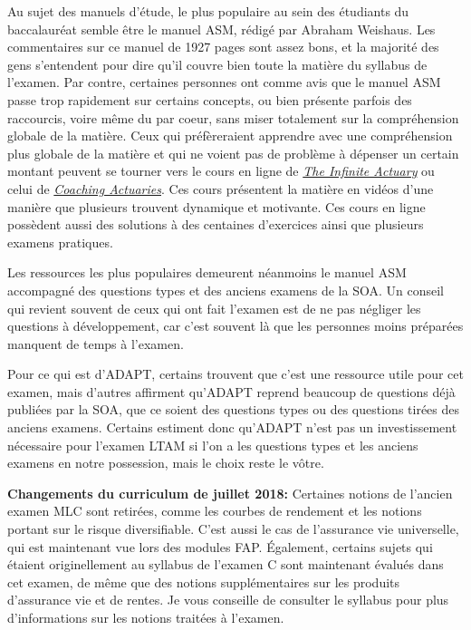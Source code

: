 Au sujet des manuels d'étude, le plus populaire au sein des étudiants du baccalauréat semble être le manuel ASM, rédigé par Abraham Weishaus. Les commentaires sur ce manuel de 1927 pages sont assez bons, et la majorité des gens s'entendent pour dire qu'il couvre bien toute la matière du syllabus de l'examen. Par contre, certaines personnes ont comme avis que le manuel ASM passe trop rapidement sur certains concepts, ou bien présente parfois des raccourcis, voire même du par coeur, sans miser totalement sur la compréhension globale de la matière. Ceux qui préfèreraient apprendre avec une compréhension plus globale de la matière et qui ne voient pas de problème à dépenser un certain montant peuvent se tourner vers le cours en ligne de \href{http://www.theinfiniteactuary.com/exams/45}{\textit{The Infinite Actuary}} ou celui de \href{https://www.coachingactuaries.com/ltam/}{\textit{Coaching Actuaries}}. Ces cours présentent la matière en vidéos d'une manière que plusieurs trouvent dynamique et motivante. Ces cours en ligne possèdent aussi des solutions à des centaines d'exercices ainsi que plusieurs examens pratiques. \vspace{\baselineskip}

Les ressources les plus populaires demeurent néanmoins le manuel ASM accompagné des questions types et des anciens examens de la SOA. Un conseil qui revient souvent de ceux qui ont fait l'examen est de ne pas négliger les questions à développement, car c'est souvent là que les personnes moins préparées manquent de temps à l'examen. \vspace{\baselineskip}

Pour ce qui est d'ADAPT, certains trouvent que c'est une ressource utile pour cet examen, mais d'autres affirment qu'ADAPT reprend beaucoup de questions déjà publiées par la SOA, que ce soient des questions types ou des questions tirées des anciens examens. Certains estiment donc qu'ADAPT n'est pas un investissement nécessaire pour l'examen LTAM si l'on a les questions types et les anciens examens en notre possession, mais le choix reste le vôtre. \vspace{\baselineskip}

\textbf{Changements du curriculum de juillet 2018:} Certaines notions de l'ancien examen MLC sont retirées, comme les courbes de rendement et les notions portant sur le risque diversifiable. C'est aussi le cas de l'assurance vie universelle, qui est maintenant vue lors des modules FAP. Également, certains sujets qui étaient originellement au syllabus de l'examen C sont maintenant évalués dans cet examen, de même que des notions supplémentaires sur les produits d'assurance vie et de rentes. Je vous conseille de consulter le syllabus pour plus d'informations sur les notions traitées à l'examen. \vspace{\baselineskip} \newpage




